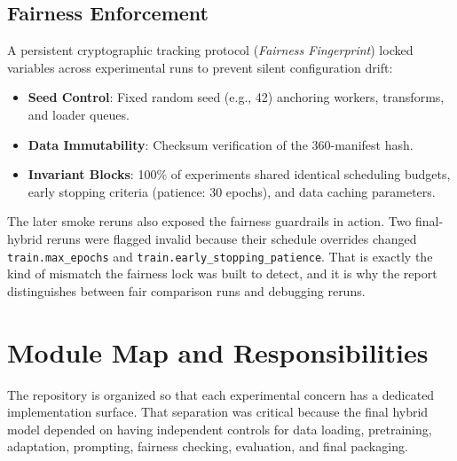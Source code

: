 \documentclass[11pt,a4paper]{article}
\begin{document}
\subsection{Fairness Enforcement}
A persistent cryptographic tracking protocol (\textit{Fairness Fingerprint}) locked variables across experimental runs to prevent silent configuration drift:
\begin{itemize}
    \item \textbf{Seed Control}: Fixed random seed (e.g., 42) anchoring workers, transforms, and loader queues.
    \item \textbf{Data Immutability}: Checksum verification of the 360-manifest hash.
    \item \textbf{Invariant Blocks}: 100\% of experiments shared identical scheduling budgets, early stopping criteria (patience: 30 epochs), and data caching parameters.
\end{itemize}

The later smoke reruns also exposed the fairness guardrails in action. Two final-hybrid reruns were flagged invalid because their schedule overrides changed \texttt{train.max\_epochs} and \texttt{train.early\_stopping\_patience}. That is exactly the kind of mismatch the fairness lock was built to detect, and it is why the report distinguishes between fair comparison runs and debugging reruns.

\section{Module Map and Responsibilities}
The repository is organized so that each experimental concern has a dedicated implementation surface. That separation was critical because the final hybrid model depended on having independent controls for data loading, pretraining, adaptation, prompting, fairness checking, evaluation, and final packaging.
\end{document}
